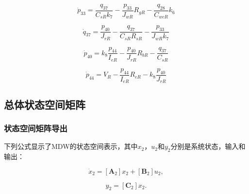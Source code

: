 \begin{enumerate}
\begin{equation}
\dot{ p } _ { 33 } = \frac { q _ { 37 } } { C _ { s R }  k _ { 7 } } - \frac { p _ { 33 } } { J _ { wR }  } R _ { gR }  - \frac { q _ { 28 } } { C _ { w cR }  } k _ { 6 }
\end{equation}

\begin{equation}
\dot{q} _ { 37 } = \frac { p _ { 40 } } { J _ { r R } } - \frac { q _ { 37 } } { C _ { sR }  R _ { sR}  } - \frac { p _ { 33 } } { J _ { w R}  k _ { 7 } }
\end{equation}

\begin{equation}
\dot{ p } _ { 40 } = k _ { 8 } \frac { p _ { 44 } } { I _ { e R}  } - \frac { p _ { 40 } } { J _ { r R }  } R _ { b R }  - \frac { q _ { 37 } } { C _ { s R } }
\end{equation}

\begin{equation}\label{p44}
\dot{ p } _ { 44 } = V _ {R}  - \frac { p _ { 44 } } { I _ { e R} } R _ { e R }  - k _ { 8 } \frac { p _ { 40 } } { J _ { r R  } }
\end{equation}
\subsection{总体状态空间矩阵}

\end{enumerate}

\subsubsection{状态空间矩阵导出}

下列公式显示了MDW的状态空间表示，其中$ x_2$，$u_2$和$y_2$分别是系统状态，输入和输出：

\begin{equation}\label{2_dot_x2}
\dot{x}_2 =[\mathbf{A}_2] x_2+[\mathbf{B}_2] u_2,
\end{equation}

\begin{equation}\label{2_y2}
y_2 =[\mathbf{C}_2] x_2.
\end{equation}

